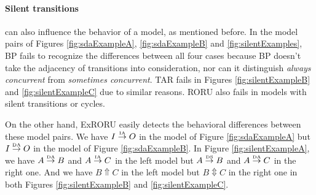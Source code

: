 \documentclass{llncs}
\begin{document}
\paragraph{\textbf{Silent transitions}} can also influence the behavior of a model, as mentioned before. In the model pairs of Figures \ref{fig:sdaExampleA}, \ref{fig:sdaExampleB} and \ref{fig:silentExamples}, BP fails to recognize the differences between all four cases because BP doesn't take the adjacency of transitions into consideration, nor can it distinguish \textit{always concurrent} from \textit{sometimes concurrent}. TAR fails in Figures \ref{fig:silentExampleB} and \ref{fig:silentExampleC} due to similar reasons. RORU also fails in models with silent transitions or cycles.

On the other hand, ExRORU easily detects the behavioral differences between these model pairs. We have $I\overset{\text{\tiny{IA}}}{\rightarrow}O$ in the model of Figure \ref{fig:sdaExampleA} but $I\overset{\text{\tiny{DA}}}{\rightarrow}O$ in the model of Figure \ref{fig:sdaExampleB}. In Figure \ref{fig:silentExampleA}, we have $A\overset{\text{\tiny{DA}}}{\rightarrow}B$ and $A\overset{\text{\tiny{IA}}}{\rightarrow}C$ in the left model but $A\overset{\text{\tiny{DS}}}{\rightarrow}B$ and $A\overset{\text{\tiny{DA}}}{\rightarrow}C$ in the right one. And we have $B\Uparrow C$ in the left model but $B\Updownarrow C$ in the right one in both Figures \ref{fig:silentExampleB} and \ref{fig:silentExampleC}.
\\
\end{document}
